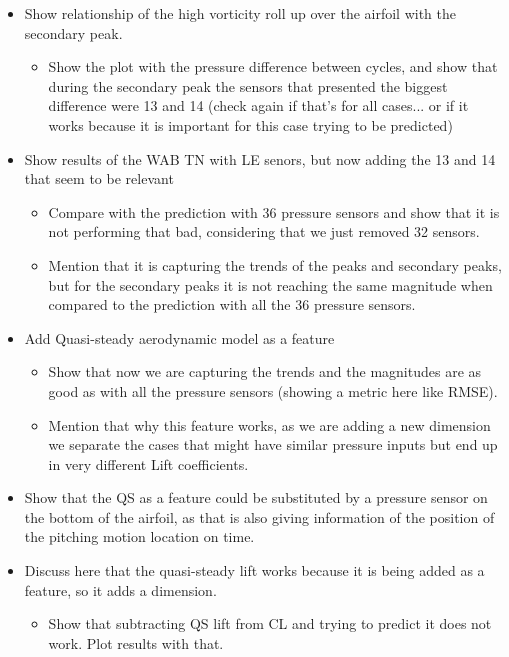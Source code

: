 \documentclass[%
 reprint,
 amsmath,amssymb,
 aps,
]{revtex4-2}
\begin{document}
\begin{itemize}
    \item Show relationship of the high vorticity roll up over the airfoil with the secondary peak.
        \begin{itemize}
            \item Show the plot with the pressure difference between cycles, and show that during the secondary peak the sensors that presented the biggest difference were 13 and 14 (check again if that's for all cases... or if it works because it is important for this case trying to be predicted)
        \end{itemize}
    \item Show results of the WAB TN with LE senors, but now adding the 13 and 14 that seem to be relevant
    \begin{itemize}
        \item Compare with the prediction with 36 pressure sensors and show that it is not performing that bad, considering that we just removed 32 sensors.
        \item Mention that it is capturing the trends of the peaks and secondary peaks, but for the secondary peaks it is not reaching the same magnitude when compared to the prediction with all the 36 pressure sensors.        
    \end{itemize}
    \item Add Quasi-steady aerodynamic model as a feature
        \begin{itemize}
            \item Show that now we are capturing the trends and the magnitudes are as good as with all the pressure sensors (showing a metric here like RMSE).
            \item Mention that why this feature works, as we are adding a new dimension we separate the cases that might have similar pressure inputs but end up in very different Lift coefficients.
            \end{itemize}            
    \item Show that the QS as a feature could be substituted by a pressure sensor on the bottom of the airfoil, as that is also giving information of the position of the pitching motion location on time.
    \item Discuss here that the quasi-steady lift works because it is being added as a feature, so it adds a dimension. 
    \begin{itemize}
        \item Show that subtracting QS lift from CL and trying to predict it does not work. Plot results with that.
    \end{itemize}
\end{itemize}
\end{document}
